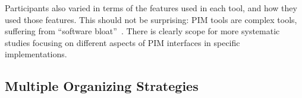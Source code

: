 Participants also varied in terms of the features used in each tool, and how they used those features. This should not be surprising: PIM tools are complex tools, suffering from ``software bloat''~\citep{mcgrenere:02}.  There is clearly scope for more systematic studies focusing on different aspects of PIM interfaces in specific implementations.  %




\subsection{Multiple Organizing Strategies}
\label{exp-study:discussion:multiple-strategies}


